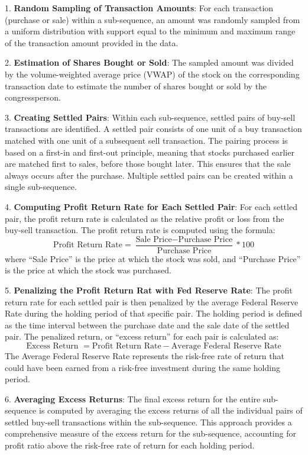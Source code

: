 \documentclass[15pt,letterpaper]{article}
\begin{document}
1. \textbf{Random Sampling of Transaction Amounts}: For each transaction (purchase or sale) within a sub-sequence, an amount was randomly sampled from a uniform distribution with support equal to the minimum and maximum range of the transaction amount provided in the data.

2. \textbf{Estimation of Shares Bought or Sold}: The sampled amount was divided by the volume-weighted average price (VWAP) of the stock on the corresponding transaction date to estimate the number of shares bought or sold by the congressperson.

3. \textbf{Creating Settled Pairs}: Within each sub-sequence, settled pairs of buy-sell transactions are identified. A settled pair consists of one unit of a buy transaction matched with one unit of a subsequent sell transaction. The pairing process is based on a first-in and first-out principle, meaning that stocks purchased earlier are matched first to sales, before those bought later. This ensures that the sale always occurs after the purchase. Multiple settled pairs can be created within a single sub-sequence.

4. \textbf{Computing Profit Return Rate for Each Settled Pair}: For each settled pair, the profit return rate is calculated as the relative profit or loss from the buy-sell transaction. The profit return rate is computed using the formula:
\[ \text{Profit Return Rate} = \frac{\text{Sale Price} - \text{Purchase Price}}{\text{Purchase Price}} * 100\]
where ``Sale Price'' is the price at which the stock was sold, and ``Purchase Price'' is the price at which the stock was purchased.

5. \textbf{Penalizing the Profit Return Rat with Fed Reserve Rate}: The profit return rate for each settled pair is then penalized by the average Federal Reserve Rate during the holding period of that specific pair. The holding period is defined as the time interval between the purchase date and the sale date of the settled pair. The penalized return, or ``excess return'' for each pair is calculated as:
\[ \text{Excess Return } = \text{Profit Return Rate} - \text{Average Federal Reserve Rate} \]
The Average Federal Reserve Rate represents the risk-free rate of return that could have been earned from a risk-free investment during the same holding period.

6. \textbf{Averaging Excess Returns}: The final excess return for the entire sub-sequence is computed by averaging the excess returns of all the individual pairs of settled buy-sell transactions within the sub-sequence. This approach provides a comprehensive measure of the excess return for the sub-sequence, accounting for profit ratio above the risk-free rate of return for each holding period.
\end{document}
